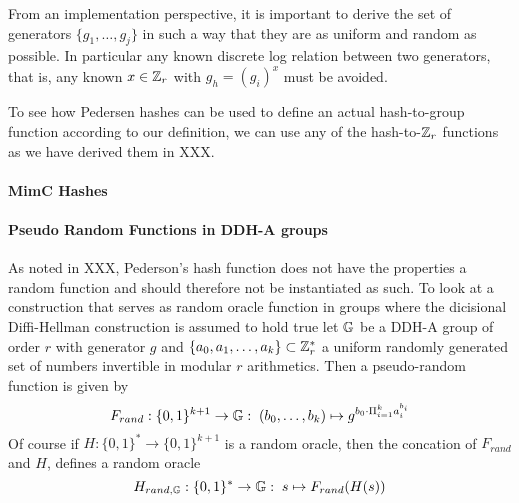 From an implementation perspective, it is important to derive the set of generators $\{g_1,\ldots,g_j\}$ in such a way that they are as uniform and random as possible. In particular any known discrete log relation between two generators, that is, any known $x\in \mathbb{Z}_r$ with $g_h = (g_i)^x$ must be avoided.

To see how Pedersen hashes can be used to define an actual hash-to-group function according to our definition, we can use any of the hash-to-$\mathbb{Z}_r$ functions as we have derived them in XXX. 

\paragraph{MimC Hashes}
\paragraph{Pseudo Random Functions in DDH-A groups}
As noted in XXX, Pederson's hash function does not have the properties a random function and should therefore not be instantiated as such. To look at a construction that serves as random oracle function in groups where the dicisional Diffi-Hellman construction is assumed to hold true let $\mathbb{G}$ be a DDH-A group of order $r$ with generator $g$ and $\{a_0,a_1,\ldots,a_k\}\subset \mathbb{Z}_{r}^*$ a uniform randomly generated set of numbers invertible in modular $r$ arithmetics. Then a pseudo-random function is given by
\begin{equation}
F_{rand}: \{0,1\}^{k+1} \to \mathbb{G}:\; (b_0,\ldots,b_k)\mapsto g^{b_0\cdot \Pi_{i=1}^k a_i^{b_i}}
\end{equation}
Of course if $H:\{0,1\}^*\to \{0,1\}^{k+1}$ is a random oracle, then the concation of $F_{rand}$ and $H$, defines a random oracle 
\begin{equation}
H_{rand,\mathbb{G}}:\{0,1\}^* \to \mathbb{G}:\; s\mapsto F_{rand}(H(s))
\end{equation}



